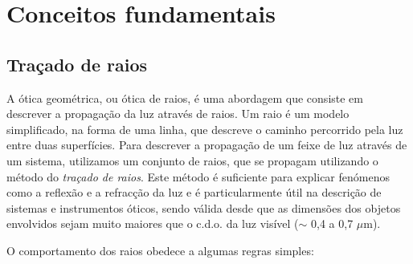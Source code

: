\documentclass[12pt,a4paper,oneside]{paper}
\begin{document}
\pagestyle{plain}

%
% 



\def\title {}


%
% 

 
\normalsize
\cleardoublepage
\setcounter{page}{1}
\selectfont
%
%

\printindex


\section{\sf Conceitos fundamentais}
\subsection{\sf Traçado de raios}
A ótica geométrica, ou ótica de raios, é uma abordagem que consiste em descrever a propagação da luz através de raios.
Um raio é um modelo simplificado, na forma de uma linha, que descreve o caminho percorrido pela luz entre duas superfícies.
Para descrever a propagação de um feixe de luz através de um sistema, utilizamos um conjunto de raios, que se propagam utilizando
o método do \emph{traçado de raios}.
Este método é suficiente para explicar fenómenos como a reflexão e a refracção da luz e é particularmente útil na descrição
de sistemas e instrumentos óticos, sendo válida desde que as dimensões dos objetos envolvidos sejam muito maiores que o c.d.o.
da luz visível ($\sim$ 0,4 a 0,7 $\mu$m).

O comportamento dos raios obedece a algumas regras simples:
\end{document}
